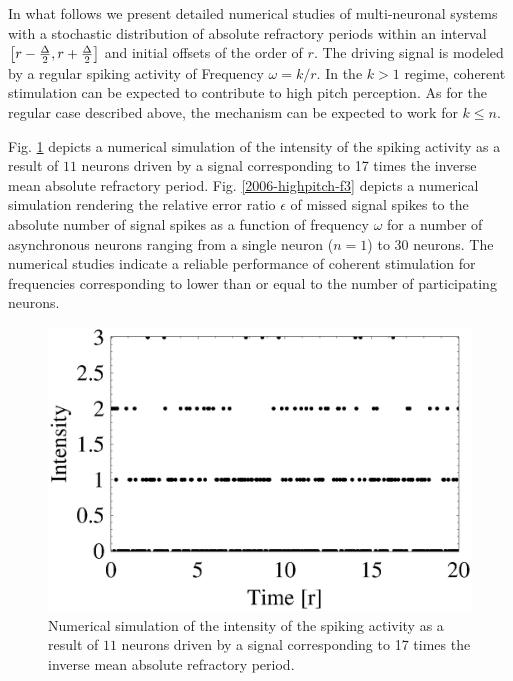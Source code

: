 \documentclass[%
 preprint,
 showpacs,
 showkeys,
 preprintnumbers,
 amsmath,amssymb,
 aps,
 prl,
  longbibliography,
 ]{revtex4-1}
\begin{document}
In what follows we present detailed numerical studies of multi-neuronal systems
with a stochastic distribution of
absolute refractory periods within an interval $\left[r-{\Delta \over 2},r+{\Delta \over 2}\right]$ and
initial offsets of the order of $r$.
The driving signal is modeled by a regular spiking activity of Frequency $\omega = k / r$.
In the  $k >1$ regime, coherent stimulation can be expected to contribute to
high pitch perception.
As for the regular case described above, the mechanism can be expected to work for $k \le n$.

Fig. \ref{2006-highpitch-f2} depicts a numerical simulation
of the intensity of the spiking activity as a result of $11$ neurons driven by a signal
corresponding to 17 times the inverse mean absolute refractory period.
Fig. \ref{2006-highpitch-f3} depicts a numerical simulation
rendering the relative error ratio $\epsilon$ of missed signal spikes to the absolute number of signal spikes
as a function of frequency
$\omega$
for a number of asynchronous neurons ranging from a single neuron ($n=1$) to 30 neurons.
The numerical studies indicate a reliable performance of coherent stimulation for
frequencies corresponding to lower than or equal to the number of participating neurons.


\begin{figure}
  \centering
  \includegraphics[width=150mm]{2006-highpitch-f1}
  \caption{Numerical simulation of the intensity of the spiking activity as a result of $11$ neurons driven by a signal
corresponding to 17 times the inverse mean absolute refractory period.
}
\label{2006-highpitch-f2}
\end{figure}
\end{document}
